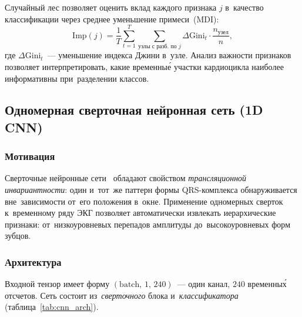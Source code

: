 Случайный лес позволяет оценить вклад каждого признака $j$
в~качество классификации через среднее уменьшение примеси~(MDI):
\begin{equation}
    \mathrm{Imp}(j) = \frac{1}{T}\sum_{t=1}^{T}
    \sum_{\text{узлы с разб.\ по }j}
    \Delta\mathrm{Gini}_t \cdot \frac{n_\text{узел}}{n},
\end{equation}
где $\Delta\mathrm{Gini}_t$~--- уменьшение индекса Джини в~узле.
Анализ важности признаков позволяет интерпретировать, какие
временны\'{е} участки кардиоцикла наиболее информативны
при~разделении классов.

\subsection{Одномерная сверточная нейронная сеть (1D CNN)}

\subsubsection{Мотивация}

Сверточные нейронные сети~\cite{lecun1998} обладают свойством
\textit{трансляционной инвариантности}: один и~тот~же паттерн
формы QRS-комплекса обнаруживается вне~зависимости от~его
положения в~окне.
Применение одномерных сверток к~временному ряду ЭКГ позволяет
автоматически извлекать иерархические признаки: от~низкоуровневых
перепадов амплитуды до~высокоуровневых форм зубцов.

\subsubsection{Архитектура}

Входной тензор имеет форму $(\text{batch},\,1,\,240)$~---
один канал, $240$ временны\'{х} отсчетов.
Сеть состоит из~\textit{сверточного} блока и~\textit{классификатора}
(таблица~\ref{tab:cnn_arch}).

